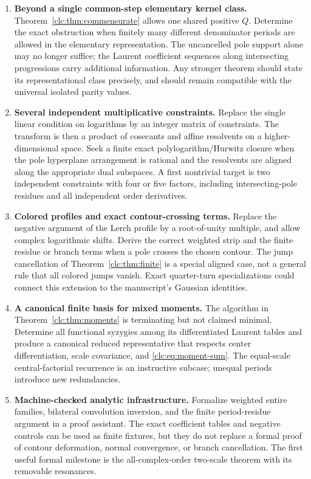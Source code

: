 \documentclass[11pt,a4paper]{article}
\numberwithin{equation}{section}
\theoremstyle{definition}\newtheorem{definition}[theorem]{Definition}
\theoremstyle{remark}\newtheorem{remark}[theorem]{Remark}
\begin{document}
\begin{enumerate}[label=\textbf{Q\arabic*.},leftmargin=2.8em,itemsep=9pt]
\item \textbf{Beyond a single common-step elementary kernel class.}
Theorem~\ref{clc:thm:commensurate} allows one shared positive $Q$.
Determine the exact obstruction when finitely many different denominator
periods are allowed in the elementary representation. The uncancelled
pole support alone may no longer suffice; the Laurent coefficient
sequences along intersecting progressions carry additional information.
Any stronger theorem should state its representational class precisely,
and should remain compatible with the universal isolated parity values.

\item \textbf{Several independent multiplicative constraints.}
Replace the single linear condition on logarithms by an integer matrix
of constraints. The transform is then a product of cosecants and affine
resolvents on a higher-dimensional space. Seek a finite exact
polylogarithm/Hurwitz closure when the pole hyperplane arrangement is
rational and the resolvents are aligned along the appropriate dual
subspaces. A first nontrivial target is two independent constraints
with four or five factors, including intersecting-pole residues and all
independent order derivatives.

\item \textbf{Colored profiles and exact contour-crossing terms.}
Replace the negative argument of the Lerch profile by a root-of-unity
multiple, and allow complex logarithmic shifts. Derive the correct
weighted strip and the finite residue or branch terms when a pole
crosses the chosen contour. The jump cancellation of
Theorem~\ref{clc:thm:finite} is a special aligned case, not a general
rule that all colored jumps vanish. Exact quarter-turn specializations
could connect this extension to the manuscript's Gaussian identities.

\item \textbf{A canonical finite basis for mixed moments.}
The algorithm in Theorem~\ref{clc:thm:moments} is terminating but not
claimed minimal. Determine all functional syzygies among its differentiated
Laurent tables and produce a canonical reduced representative that
respects center differentiation, scale covariance, and
\eqref{clc:eq:moment-sum}. The equal-scale central-factorial recurrence
is an instructive subcase; unequal periods introduce new redundancies.

\item \textbf{Machine-checked analytic infrastructure.}
Formalize weighted entire families, bilateral convolution inversion,
and the finite period-residue argument in a proof assistant. The exact
coefficient tables and negative controls can be used as finite fixtures,
but they do not replace a formal proof of contour deformation, normal
convergence, or branch cancellation. The first useful formal milestone
is the all-complex-order two-scale theorem with its removable resonances.
\end{enumerate}
\end{document}
